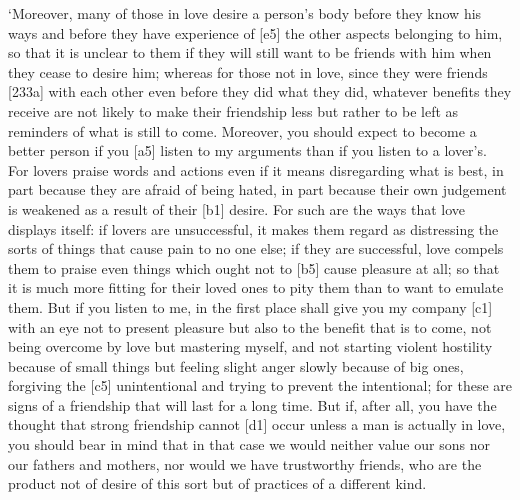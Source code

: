 ‘Moreover, many of those in love desire a person's body before they know
his ways and before they have experience of {[}e5{]} the other aspects
belonging to him, so that it is unclear to them if they will still want
to be friends with him when they cease to desire him; whereas for those
not in love, since they were friends {[}233a{]} with each other even
before they did what they did, whatever benefits they
receive are not likely to
make their friendship less but rather to be left as reminders of what is
still to come. Moreover, you should expect to become a better person if
you {[}a5{]} listen to my arguments than if you listen to a lover's. For
lovers praise words and actions even if it means disregarding what is
best, in part because they are afraid of being hated, in part because
their own judgement is weakened as a result of their {[}b1{]} desire.
For such are the ways that love displays itself: if lovers are
unsuccessful, it makes them regard as distressing the sorts of things
that cause pain to no one else; if they are successful, love compels
them to praise even things which ought not to {[}b5{]} cause pleasure at
all; so that it is much more fitting for their loved ones to pity them
than to want to emulate them. But if you listen to me, in the first
place shall give you my company {[}c1{]} with an eye not to present
pleasure but also to the benefit that is to come, not being overcome by
love but mastering myself, and not starting violent hostility because of
small things but feeling slight anger slowly because of big ones,
forgiving the {[}c5{]} unintentional and trying to prevent the
intentional; for these are signs of a friendship that will last for a
long time. But if, after all, you have the thought that strong
friendship cannot {[}d1{]} occur unless a man is actually in love, you
should bear in mind that in that case we would neither value our sons
nor our fathers and mothers, nor would we have trustworthy friends, who
are the product not of desire of this sort but of practices of a
different kind.

